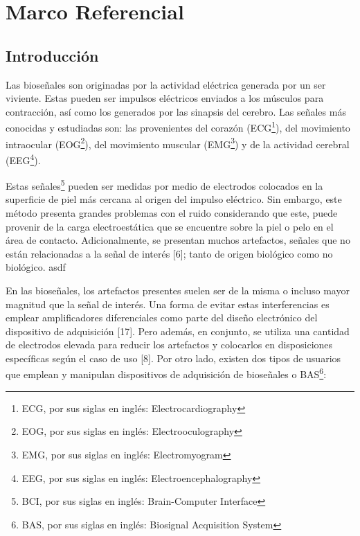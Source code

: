 \chapter{Marco Referencial}

\section{Introducción}
\label{sec:orga059c5a}
Las bioseñales son originadas por la actividad eléctrica generada por un ser viviente. Estas pueden ser impulsos eléctricos enviados a los músculos para contracción, así como los generados por las sinapsis del cerebro. Las señales más conocidas y estudiadas son: las provenientes del corazón (ECG\footnote{ECG, por sus siglas en inglés: Electrocardiography}), del movimiento intraocular (EOG\footnote{EOG, por sus siglas en inglés: Electrooculography}), del movimiento muscular (EMG\footnote{EMG, por sus siglas en inglés: Electromyogram}) y de la actividad cerebral (EEG\footnote{EEG, por sus siglas en inglés: Electroencephalography}).

Estas señales\footnote{BCI, por sus siglas en inglés: Brain-Computer Interface\label{org2010a5c}} pueden ser medidas por medio de electrodos colocados en la superficie de piel más cercana al origen del impulso eléctrico. Sin embargo, este método presenta grandes problemas con el ruido considerando que este, puede provenir de la carga electroestática que se encuentre sobre la piel o pelo en el área de contacto. Adicionalmente, se presentan muchos artefactos, señales que no están relacionadas a la señal de interés [6]; tanto de origen biológico como no biológico.
asdf

En las bioseñales, los artefactos presentes suelen ser de la misma o incluso mayor magnitud que la señal de interés. Una forma de evitar estas interferencias es emplear amplificadores diferenciales como parte del diseño electrónico del dispositivo de adquisición [17]. Pero además, en conjunto, se utiliza una cantidad de electrodos elevada para reducir los artefactos y colocarlos en disposiciones específicas según el caso de uso [8].
Por otro lado, existen dos tipos de usuarios que emplean y manipulan dispositivos de adquisición de bioseñales o BAS\footnote{BAS, por sus siglas en inglés: Biosignal Acquisition System}:


